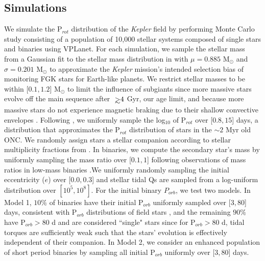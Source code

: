 \documentclass[twocolumn]{aastex61}
\def\gsim{~\rlap{$>$}{\lower 1.0ex\hbox{$\sim$}}}
\begin{document}

\subsection{Simulations} \label{sec:simulations}

We simulate the P$_{rot}$ distribution of the \textit{Kepler} field by performing Monte Carlo study consisting of a population of 10,000 stellar systems composed of single stars and binaries using VPLanet. For each simulation, we sample the stellar mass from a Gaussian fit to the stellar mass distribution in \citet{McQuillan2014} with $\mu=0.885$ M$_{\odot}$ and $\sigma=0.201$ M$_{\odot}$ to approximate the \textit{Kepler} mission's intended selection bias of monitoring FGK stars for Earth-like planets. We restrict stellar masses to be within [$0.1,1.2$] M$_{\odot}$ to limit the influence of subgiants since more massive stars evolve off the main sequence after $\gsim 4$ Gyr, our age limit, and because more massive stars do not experience magnetic braking due to their shallow convective envelopes \citep{Kraft1967}. Following \citet{Matt2015}, we uniformly sample the log$_{10}$ of P$_{rot}$ over [$0.8,15$] days, a distribution that approximates the P$_{rot}$ distribution of stars in the ${\sim}2$ Myr old ONC.  We randomly assign stars a stellar companion according to stellar multiplicity fractions from \citet{Duchene2013}. In binaries, we compute the secondary star's mass by uniformly sampling the mass ratio over [$0.1, 1$] following observations of mass ratios in low-mass binaries \citep{Raghavan2010}.We uniformly randomly sampling the initial eccentricity ($e$) over [$0.0,0.3$] and stellar tidal Qs are sampled from a log-uniform distribution over $[10^5,10^8]$. For the initial binary $P_{orb}$, we test two models. In Model 1, $10\%$ of binaries have their initial P$_{orb}$ uniformly sampled over [$3,80$] days, consistent with P$_{orb}$ distributions of field stars \citep[e.g.][]{Raghavan2010}, and the remaining $90\%$ have P$_{orb} > 80$ d and are considered ``single" stars since for P$_{orb} > 80$ d, tidal torques are sufficiently weak such that the stars' evolution is effectively independent of their companion.  In Model 2, we consider an enhanced population of short period binaries by sampling all initial P$_{orb}$ uniformly over [$3,80$] days.  
\end{document}
